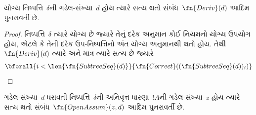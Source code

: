 \begin{prop}
  યોગ્ય નિષ્પત્તિ~$\delta$ની
  ગડેલ-સંખ્યા~$d$ હોય ત્યારે સત્ય
  થતો સંબંધ~$\fn{Deriv}(d)$ આદિમ
  પુનરાવર્તી છે.
\end{prop}

\begin{proof}
  નિષ્પત્તિ~$\delta$ ત્યારે યોગ્ય
  છે જ્યારે તેનું દરેક અનુમાન કોઈ
  નિયમનો યોગ્ય ઉપયોગ હોય, એટલે કે
  તેની દરેક ઉપ-નિષ્પત્તિનો અંત
  યોગ્ય અનુમાનથી થતો હોય. તેથી
  $\fn{Deriv}(d)$ ત્યારે અને માત્ર
  ત્યારે સત્ય છે જ્યારે
  \[
  \bforall{i<\len{\fn{SubtreeSeq}(d)}}{\fn{Correct}((\fn{SubtreeSeq}(d))_i)}
  \]
\end{proof}

\begin{prop}
  ગડેલ-સંખ્યા~$d$ ધરાવતી
  નિષ્પત્તિ~$\delta$ની
  અનિવૃત્ત ધારણા~$!A$ની
  ગડેલ-સંખ્યા~$z$ હોય ત્યારે સત્ય
  થતો સંબંધ~$\fn{OpenAssum}(z, d)$
  આદિમ પુનરાવર્તી છે.
\end{prop}

